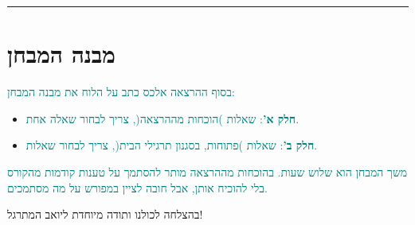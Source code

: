 \documentclass[english,hebrew]{article}
\begin{document}
\rule[0.5ex]{1\columnwidth}{1pt}

\medskip{}

\section{מבנה המבחן}

\textcolor{teal}{בסוף ההרצאה אלכס כתב על הלוח את מבנה המבחן:}
\begin{itemize}
\item \textbf{\textcolor{teal}{חלק א'}}\textcolor{teal}{: }\textcolor{teal}{{}\endL}\textcolor{teal}{{}
שאלות )הוכחות מההרצאה(, צריך לבחור שאלה אחת.}
\item \textbf{\textcolor{teal}{חלק ב'}}\textcolor{teal}{: }\textcolor{teal}{{}\endL}\textcolor{teal}{{}
שאלות )פתוחות, בסגנון תרגילי הבית(, צריך לבחור }\textcolor{teal}{{}\endL}\textcolor{teal}{{}
שאלות.}
\end{itemize}
\textcolor{teal}{משך המבחן הוא שלוש שעות. בהוכחות מההרצאה מותר להסתמך
על טענות קודמות מהקורס בלי להוכיח אותן, אבל חובה לציין במפורש על מה
מסתמכים.}

בהצלחה לכולנו ותודה מיוחדת ליואב המתרגל!
\end{document}
